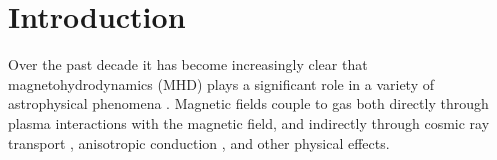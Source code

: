\documentclass[modern, linenumbers]{aastex631}
\begin{document}
\section{Introduction}
\label{sec:intro}



Over the past decade it has become increasingly clear that magnetohydrodynamics (MHD) plays a significant role in a variety of astrophysical phenomena \citep[e.g.][]{charbonneau_2014, beck_2016, naab_2017, han_2017, kaspi_2017, blandford_2019, Nakariakov_2020, davis_2020, Trujillo_2022, Philippov_2022, brandenburg_2023}. Magnetic fields couple to gas both directly through plasma interactions with the magnetic field, and indirectly through cosmic ray transport \citep[e.g.][]{pfrommer_simulating_2017, girichidis_spectrally_2019, chan_cosmic_2019, buck_effects_2020, werhahn_cosmic_2021, yoshida_trajectory_2021, girichidis_spectrally_2022, nunez-castineyra_cosmic-ray_2022, werhahn_gamma-ray_2023}, anisotropic conduction \citep[e.g.][]{yang_fermi_2012, hanasz_cosmic_2013, simpson_role_2016, girichidis_launching_2016, pakmor_galactic_2016, bruggen_2023}, and other physical effects.
\end{document}
